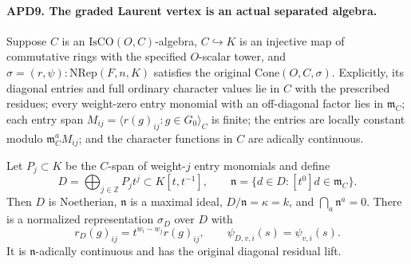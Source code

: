 \documentclass[11pt,a4paper]{article}
\numberwithin{equation}{section}
\theoremstyle{remark}\newtheorem{remark}[theorem]{Remark}
\begin{document}
\paragraph{APD9. The graded Laurent vertex is an actual separated algebra.}
\label{claim:APD9}
Suppose \(C\) is an \(\mathrm{IsCO}(O,C)\)-algebra,
\(C\hookrightarrow K\) is an injective map of commutative
rings with the specified \(O\)-scalar tower, and
\(\sigma=(r,\psi):\mathrm{NRep}(F,n,K)\) satisfies the original
\(\mathrm{Cone}(O,C,\sigma)\).  Explicitly, its diagonal
entries and full ordinary character values lie in \(C\) with
the prescribed residues; every weight-zero entry monomial with
an off-diagonal factor lies in \(\mathfrak m_C\); each entry
span \(M_{ij}=\langle r(g)_{ij}:g\in G_0\rangle_C\) is
finite; the entries are locally constant modulo
\(\mathfrak m_C^aM_{ij}\); and the character functions in
\(C\) are adically continuous.

Let \(P_j\subset K\) be the \(C\)-span of weight-\(j\)
entry monomials and define
\[
 D=\bigoplus_{j\in\mathbb Z}P_jt^j\subset K[t,t^{-1}],
 \qquad
 \mathfrak n=\{d\in D:[t^0]d\in\mathfrak m_C\}.            \tag{APD.18}
\]
Then \(D\) is Noetherian, \(\mathfrak n\) is a maximal ideal,
\(D/\mathfrak n=\kappa=k\), and
\(\bigcap_a\mathfrak n^a=0\).  There is a normalized
representation \(\sigma_D\) over \(D\) with
\[
 r_D(g)_{ij}=t^{w_i-w_j}r(g)_{ij},\qquad
 \psi_{D,v,i}(s)=\psi_{v,i}(s).                            \tag{APD.19}
\]
It is \(\mathfrak n\)-adically continuous and has the original
diagonal residual lift.
\end{document}
